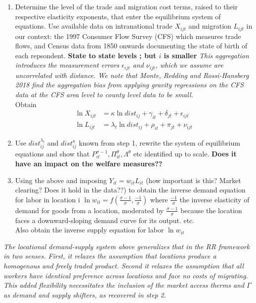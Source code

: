 \documentclass[10pt, final]{article}
\begin{document}
\begin{enumerate}
    \item Determine the level of the trade and migration cost terms, raised to their respective elasticity exponents, that enter the equilibrium system of equations. Use available data on intranational trade $X_{ijt}$ and migration $L_{ijt}$ in our context: the 1997 Consumer Flow Survey (CFS) which measures trade flows, and Census data from 1850 onwards documenting the state of birth of each repsondent. \textbf{State to state levels ; but $i$ is smaller} \textit{This aggregation introduces the measurement errors $\epsilon_{ijt}$ and $\nu_{ijt}$, which we assume are uncorrelated with distance. We note that Monte, Redding and Rossi-Hansberg 2018 find the aggregation bias from applying gravity regressions on the CFS data at the CFS area level to county level data to be small.}
    \\
    Obtain
    \begin{align*}
        \ln X_{ijt} &= \kappa \ln dist_{ij} + \gamma_{it} + \delta_{jt} + \epsilon_{ijt} \\
        \ln L_{ijt} &= \lambda_t \ln dist_{ij} + \rho_{it} + \pi_{jt} + \nu_{ijt}
    \end{align*}
    \item Use $dist_{ij}^{\lambda_t}$ and $dist_{ij}^{\kappa}$ known from step 1, rewrite the system of equilibrium equations and show that $P_{it}^{\sigma-1}, \Pi_{it}^\theta, \Lambda^\theta$ etc identified up to scale. \textbf{Does it have an impact on the welfare measures??}
    \item Using the above and imposing $Y_{it} = w_{it} L_{it}$ (how important is this? Market clearing? Does it hold in the data??) to obtain the inverse demand equation for labor in location i $\ln w_{it} = f(\frac{\sigma-1}{\sigma}, \frac{-1}{\sigma})$ where $\frac{-1}{\sigma}$ the inverse elasticity of demand for goods from a location, moderated by $\frac{\sigma-1}{\sigma}$ because the location faces a downward-sloping demand curve for its output. etc.
    \\
    Also obtain the inverse supply equation for labor $\ln w_{it}$
\end{enumerate}
\textit{The locational demand-supply system above generalizes that in the RR framework in two senses. First, it relaxes the assumption that locations produce a homogenous and freely traded product. Second it relaxes the assumption that all workers have identical preference across locations and face no costs of migrating. This added flexibility necessitates the inclusion of the market access therms and $\Gamma$ as demand and supply shifters, as recovered in step 2.}
\end{document}
